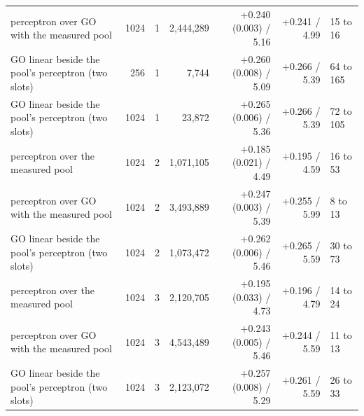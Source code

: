 \begin{table}[H]
\begin{tabular}{@{}lrrrrrl@{}}
    perceptron over GO with the measured pool & 1024 & 1 & 2,444,289 & +0.240 (0.003) / 5.16 & +0.241 / 4.99 & 15 to 16 \\
    GO linear beside the pool's perceptron (two slots) & 256 & 1 & 7,744 & +0.260 (0.008) / 5.09 & +0.266 / 5.39 & 64 to 165 \\
    GO linear beside the pool's perceptron (two slots) & 1024 & 1 & 23,872 & +0.265 (0.006) / 5.36 & +0.266 / 5.39 & 72 to 105 \\
    perceptron over the measured pool & 1024 & 2 & 1,071,105 & +0.185 (0.021) / 4.49 & +0.195 / 4.59 & 16 to 53 \\
    perceptron over GO with the measured pool & 1024 & 2 & 3,493,889 & +0.247 (0.003) / 5.39 & +0.255 / 5.99 & 8 to 13 \\
    GO linear beside the pool's perceptron (two slots) & 1024 & 2 & 1,073,472 & +0.262 (0.006) / 5.46 & +0.265 / 5.59 & 30 to 73 \\
    perceptron over the measured pool & 1024 & 3 & 2,120,705 & +0.195 (0.033) / 4.73 & +0.196 / 4.79 & 14 to 24 \\
    perceptron over GO with the measured pool & 1024 & 3 & 4,543,489 & +0.243 (0.005) / 5.46 & +0.244 / 5.59 & 11 to 13 \\
    GO linear beside the pool's perceptron (two slots) & 1024 & 3 & 2,123,072 & +0.257 (0.008) / 5.29 & +0.261 / 5.59 & 26 to 33 \\
    \hline
  \end{tabular}
\end{table}
